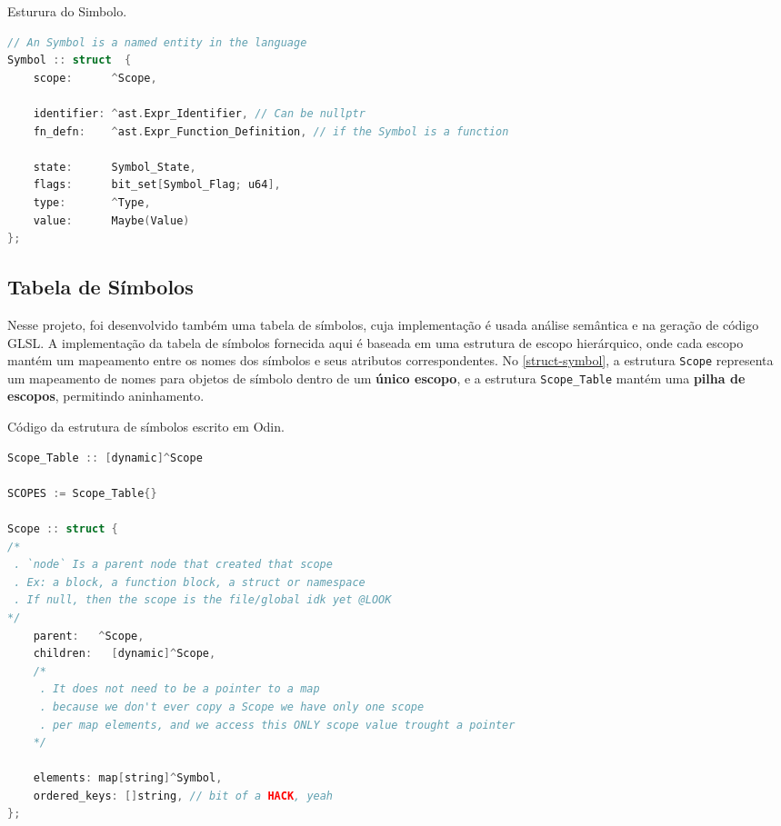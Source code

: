 \begin{codigo}[htb]
    \caption{\small Esturura do Simbolo. }
    \label{cod-symbol}
\begin{lstlisting}[language=C, numbers=none, frame=none, inputencoding=latin1]
// An Symbol is a named entity in the language
Symbol :: struct  {
    scope:      ^Scope,

    identifier: ^ast.Expr_Identifier, // Can be nullptr
    fn_defn:    ^ast.Expr_Function_Definition, // if the Symbol is a function

    state:      Symbol_State,
    flags:      bit_set[Symbol_Flag; u64],
    type:       ^Type,
    value:      Maybe(Value)
};

\end{lstlisting}
\end{codigo}


\subsection{Tabela de Símbolos}

Nesse projeto, foi desenvolvido também uma tabela de símbolos, cuja implementação é usada análise semântica e na geração de código GLSL. A implementação da tabela de símbolos fornecida aqui é baseada em uma estrutura de escopo hierárquico, onde cada escopo mantém um mapeamento entre os nomes dos símbolos e seus atributos correspondentes. No \autoref{struct-symbol}, a estrutura \texttt{Scope} representa um mapeamento de nomes para objetos de símbolo dentro de um \textbf{único escopo}, e a estrutura \texttt{Scope\_Table} mantém uma \textbf{pilha de escopos}, permitindo aninhamento.

\begin{codigo}[H]
\caption{\small Código da estrutura de símbolos escrito em Odin.}
\label{struct-symbol}
\begin{lstlisting}[language=C]
Scope_Table :: [dynamic]^Scope

SCOPES := Scope_Table{}

Scope :: struct {
/*
 . `node` Is a parent node that created that scope
 . Ex: a block, a function block, a struct or namespace
 . If null, then the scope is the file/global idk yet @LOOK
*/
    parent:   ^Scope,
    children:   [dynamic]^Scope,
    /*
     . It does not need to be a pointer to a map
     . because we don't ever copy a Scope we have only one scope
     . per map elements, and we access this ONLY scope value trought a pointer
    */

    elements: map[string]^Symbol,
    ordered_keys: []string, // bit of a HACK, yeah
};

\end{lstlisting}
\end{codigo}


